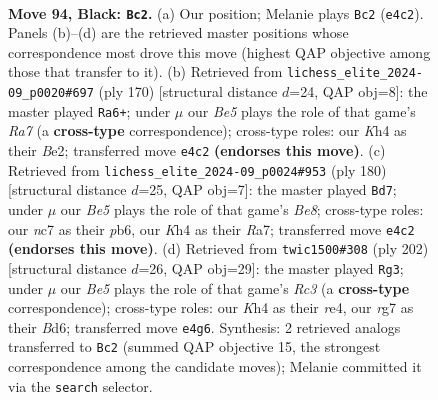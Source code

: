 \documentclass[11pt]{article}
\begin{document}
\clearpage

\begin{figure}[p]\centering
\begin{subfigure}{0.46\textwidth}\centering
\resizebox{\linewidth}{!}{%
\newchessgame
\chessboard[
  setfen={8/2N3R1/5P2/8/npB1b1Pk/8/5K2/8 b - - 2 94},
  showmover=false,
  pgfstyle=straightmove, color=movearrow, markmove={e4-c2}
]}
\caption{}
\end{subfigure}\hfill
\begin{subfigure}{0.46\textwidth}\centering
\resizebox{\linewidth}{!}{%
\newchessgame
\chessboard[
  setfen={8/R7/3k4/8/4K1pp/6r1/4B3/8 w - - 8 86},
  showmover=false,
  pgfstyle=straightmove, color=movearrow, markmove={a7-a6}
]}
\caption{}
\end{subfigure}
\\[4pt]
\begin{subfigure}{0.46\textwidth}\centering
\resizebox{\linewidth}{!}{%
\newchessgame
\chessboard[
  setfen={4B3/R7/1p2Pk2/p5r1/3K4/8/8/8 w - - 6 91},
  showmover=false,
  pgfstyle=straightmove, color=movearrow, markmove={e8-d7}
]}
\caption{}
\end{subfigure}\hfill
\begin{subfigure}{0.46\textwidth}\centering
\resizebox{\linewidth}{!}{%
\newchessgame
\chessboard[
  setfen={8/8/1k1Bp1b1/4P3/4r1pK/2R5/8/8 w - - 74 102},
  showmover=false,
  pgfstyle=straightmove, color=movearrow, markmove={c3-g3}
]}
\caption{}
\end{subfigure}
\caption{\textbf{Move 94, Black: \texttt{Bc2}.} (a) Our position; Melanie plays \texttt{Bc2} (\texttt{e4c2}). Panels (b)--(d) are the retrieved master positions whose correspondence most drove this move (highest QAP objective among those that transfer to it). (b) Retrieved from \texttt{lichess\_elite\_2024-09\_p0020\#697} (ply 170) [structural distance $d$=24, QAP obj=8]: the master played \texttt{Ra6+}; under $\mu$ our \emph{Be5} plays the role of that game's \emph{Ra7} (a \textbf{cross-type} correspondence); cross-type roles: our \emph{K}h4 as their \emph{B}e2; transferred move \texttt{e4c2} \textbf{(endorses this move)}. (c) Retrieved from \texttt{lichess\_elite\_2024-09\_p0024\#953} (ply 180) [structural distance $d$=25, QAP obj=7]: the master played \texttt{Bd7}; under $\mu$ our \emph{Be5} plays the role of that game's \emph{Be8}; cross-type roles: our \emph{n}c7 as their \emph{p}b6, our \emph{K}h4 as their \emph{R}a7; transferred move \texttt{e4c2} \textbf{(endorses this move)}. (d) Retrieved from \texttt{twic1500\#308} (ply 202) [structural distance $d$=26, QAP obj=29]: the master played \texttt{Rg3}; under $\mu$ our \emph{Be5} plays the role of that game's \emph{Rc3} (a \textbf{cross-type} correspondence); cross-type roles: our \emph{K}h4 as their \emph{r}e4, our \emph{r}g7 as their \emph{B}d6; transferred move \texttt{e4g6}. Synthesis: 2 retrieved analogs transferred to \texttt{Bc2} (summed QAP objective 15, the strongest correspondence among the candidate moves); Melanie committed it via the \texttt{search} selector.}
\label{fig:thought-m187}
\end{figure}
\end{document}
